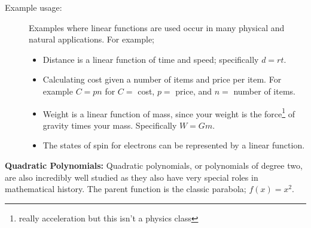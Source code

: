\documentclass{ximera}
\begin{document}
\begin{description}
            \item[Example usage:] Examples where linear functions are used occur in many physical and natural applications. For example;
            \begin{itemize}
                \item Distance is a linear function of time and speed; specifically $d = rt$.
                \item Calculating cost given a number of items and price per item. For example $C = pn$ for $C = $ cost, $p = $ price, and $n = $ number of items.
                \item Weight is a linear function of mass, since your weight is the force\footnote{really acceleration but this isn't a physics class} of gravity times your mass. Specifically $W = Gm$.
                \item The states of spin for electrons can be represented by a linear function.
            \end{itemize}
        \end{description}
        
        \textbf{Quadratic Polynomials:} Quadratic polynomials, or polynomials of degree two, are also incredibly well studied as they also have very special roles in mathematical history. The parent function is the classic parabola; $f(x) = x^2$. 
        
\end{document}
